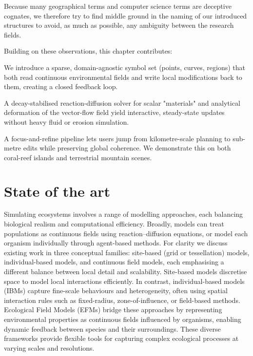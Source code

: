 Because many geographical terms and computer science terms are deceptive cognates, we therefore try to find middle ground in the naming of our introduced structures to avoid, as much as possible, any ambiguity between the research fields. 

Building on these observations, this chapter contributes:  
\begin{Itemize}
    \Item{}  We introduce a sparse, domain-agnostic symbol set (points, curves, regions) that both read continuous environmental fields and write local modifications back to them, creating a closed feedback loop.

    \Item{}  A decay-stabilised reaction-diffusion solver for scalar "materials" and analytical deformation of the vector-flow field yield interactive, steady-state updates without heavy fluid or erosion simulation.

    \Item{}  A focus-and-refine pipeline lets users jump from kilometre-scale planning to sub-metre edits while preserving global coherence. We demonstrate this on both coral-reef islands and terrestrial mountain scenes.
\end{Itemize}












\section{State of the art}
\label{sec:env-obj-related-works}

Simulating ecosystems involves a range of modelling approaches, each balancing biological realism and computational efficiency. Broadly, models can treat populations as continuous fields using reaction--diffusion equations, or model each organism individually through agent-based methods. For clarity we discuss existing work in three conceptual families: site-based (grid or tessellation) models, individual-based models, and continuous field models, each emphasising a different balance between local detail and scalability. Site-based models discretise space to model local interactions efficiently. In contrast, individual-based models (IBMs) capture fine-scale behaviours and heterogeneity, often using spatial interaction rules such as fixed-radius, zone-of-influence, or field-based methods. Ecological Field Models (EFMs) bridge these approaches by representing environmental properties as continuous fields influenced by organisms, enabling dynamic feedback between species and their surroundings. These diverse frameworks provide flexible tools for capturing complex ecological processes at varying scales and resolutions.

